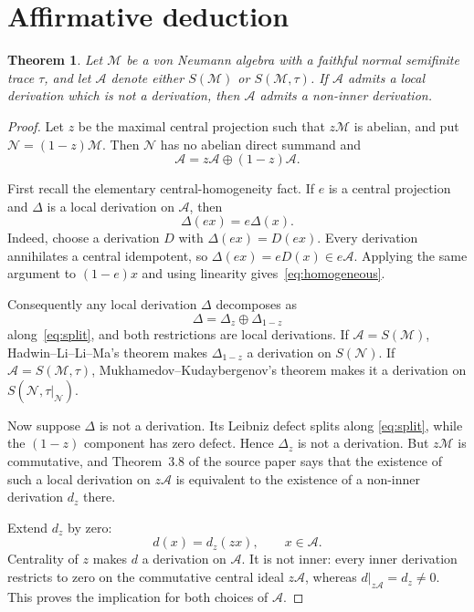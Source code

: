 \documentclass[11pt]{article}
\newtheorem{theorem}{Theorem}
\newcommand{\A}{\mathcal A}
\newcommand{\M}{\mathcal M}
\newcommand{\N}{\mathcal N}
\begin{document}
\section*{Affirmative deduction}

\begin{theorem}
Let $\M$ be a von Neumann algebra with a faithful normal semifinite trace
$\tau$, and let $\A$ denote either $S(\M)$ or $S(\M,\tau)$. If $\A$ admits
a local derivation which is not a derivation, then $\A$ admits a non-inner
derivation.
\end{theorem}

\begin{proof}
Let $z$ be the maximal central projection such that $z\M$ is abelian, and
put $\N=(1-z)\M$. Then $\N$ has no abelian direct summand and
\begin{equation}\label{eq:split}
            \A=z\A\oplus(1-z)\A.
\end{equation}

First recall the elementary central-homogeneity fact. If $e$ is a central
projection and $\Delta$ is a local derivation on $\A$, then
\begin{equation}\label{eq:homogeneous}
                         \Delta(ex)=e\Delta(x).
\end{equation}
Indeed, choose a derivation $D$ with $\Delta(ex)=D(ex)$. Every derivation
annihilates a central idempotent, so
$\Delta(ex)=eD(x)\in e\A$. Applying the same argument to $(1-e)x$ and using
linearity gives~\eqref{eq:homogeneous}.

Consequently any local derivation $\Delta$ decomposes as
\[
                  \Delta=\Delta_z\oplus\Delta_{1-z}
\]
along~\eqref{eq:split}, and both restrictions are local derivations. If
$\A=S(\M)$, Hadwin--Li--Li--Ma's theorem makes $\Delta_{1-z}$ a
derivation on $S(\N)$. If $\A=S(\M,\tau)$,
Mukhamedov--Kudaybergenov's theorem makes it a derivation on
$S(\N,\tau|_{\N})$.

Now suppose $\Delta$ is not a derivation. Its Leibniz defect splits along
\eqref{eq:split}, while the $(1-z)$ component has zero defect. Hence $\Delta_z$ is not a
derivation. But $z\M$ is commutative, and Theorem~3.8 of the source paper
says that the existence of such a local derivation on $z\A$ is equivalent
to the existence of a non-inner derivation $d_z$ there.

Extend $d_z$ by zero:
\[
                 d(x)=d_z(zx),\qquad x\in\A.
\]
Centrality of $z$ makes $d$ a derivation on $\A$. It is not inner: every
inner derivation restricts to zero on the commutative central ideal $z\A$,
whereas $d|_{z\A}=d_z\ne0$. This proves the implication for both choices of
$\A$.
\end{proof}
\end{document}
